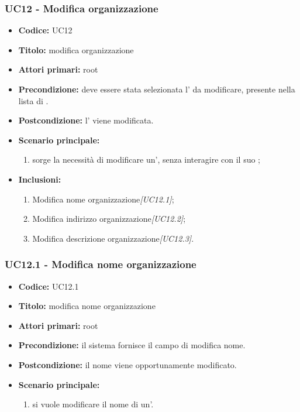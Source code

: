 \documentclass[casi-duso]{subfiles}
\begin{document}
\subsubsection{UC12 - Modifica organizzazione}
\label{subsub:UC12}
\begin{itemize}
  \item \textbf{Codice:} UC12
  \item \textbf{Titolo:} modifica organizzazione
  \item \textbf{Attori primari:} root
  \item \textbf{Precondizione:} deve essere stata selezionata l' da modificare, presente nella lista di .
  \item \textbf{Postcondizione:} l' viene modificata.
  \item \textbf{Scenario principale:}
  \begin{enumerate}
    \item sorge la necessità di modificare un', senza interagire con il suo ;
  \end{enumerate}
  \item \textbf{Inclusioni:}
  \begin{enumerate}
    \item Modifica nome organizzazione\emph{[UC12.1]};
    \item Modifica indirizzo organizzazione\emph{[UC12.2]};
    \item Modifica descrizione organizzazione\emph{[UC12.3]}.
  \end{enumerate}
\end{itemize}

\subsubsection{UC12.1 - Modifica nome organizzazione}
\label{subsub:UC12.1}
\begin{itemize}
  \item \textbf{Codice:} UC12.1
  \item \textbf{Titolo:} modifica nome organizzazione
  \item \textbf{Attori primari:} root
  \item \textbf{Precondizione:} il sistema fornisce il campo di modifica nome.
  \item \textbf{Postcondizione:} il nome viene opportunamente modificato.
  \item \textbf{Scenario principale:} 
  \begin{enumerate}
    \item si vuole modificare il nome di un'.
  \end{enumerate}
  
\end{itemize}
\end{document}
